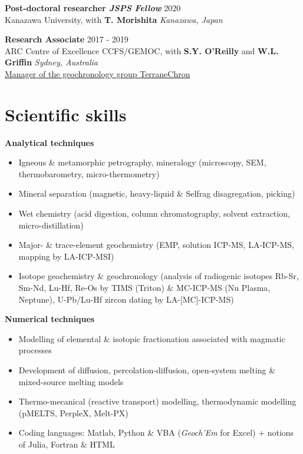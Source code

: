 \documentclass[a4paper,10pt]{article}
\begin{document}
    \textbf{Post-doctoral researcher \textit{JSPS Fellow}}
    \hfill {2020}\\
    Kanazawa University, with \textbf{T. Morishita}
    \hfill \textit{Kanazawa, Japan}
    
    \textbf{Research Associate}
    \hfill {2017 - 2019}\\
    ARC Centre of Excellence CCFS/GEMOC, with \textbf{S.Y. O'Reilly} and \textbf{W.L. Griffin}
    \hfill \textit{Sydney, Australia}\\
    \uline{Manager of the geochronology group TerraneChron\textsuperscript{\textregistered}}
    
\section{Scientific skills}

    \textbf{Analytical techniques} 
    \begin{itemize}[itemsep=0pt,parsep=2pt]
        \item Igneous \& metamorphic petrography, mineralogy (microscopy, SEM, thermobarometry, micro-thermometry)
        \item Mineral separation (magnetic, heavy-liquid \& Selfrag disagregation, picking)
        \item Wet chemistry (acid digestion, column chromatography, solvent extraction, micro-distillation)
        \item Major- \& trace-element geochemistry (EMP, solution ICP-MS, LA-ICP-MS, mapping by LA-ICP-MSI)
        \item Isotope geochemistry \& geochronology (analysis of radiogenic isotopes Rb-Sr, Sm-Nd, Lu-Hf, Re-Os by TIMS (Triton) \& MC-ICP-MS (Nu Plasma, Neptune), U-Pb/Lu-Hf zircon dating by LA-[MC]-ICP-MS)
    \end{itemize}
    
    \textbf{Numerical techniques}
    \begin{itemize}[itemsep=0pt,parsep=2pt]
        \item Modelling of elemental \& isotopic fractionation associated with magmatic processes
        \item Development of diffusion, percolation-diffusion, open-system melting \& mixed-source melting models
        \item Thermo-mecanical (reactive transport) modelling, thermodynamic modelling (pMELTS, PerpleX, Melt-PX)
        \item Coding languages: Matlab, Python \& VBA (\textit{Geoch’Em} for Excel) + notions of Julia, Fortran \& HTML
        
    \end{itemize}
    
\end{document}
